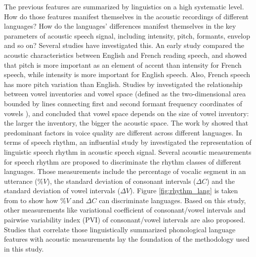 The previous features are summarized by linguistics on a high systematic level. How do those features manifest themselves in the acoustic recordings of different languages? How do the languages' differences manifest themselves in the key parameters of acoustic speech signal, including intensity, pitch, formants, envelop and so on? Several studies have investigated this. An early study \citep{parmenter1933experimental} compared the acoustic characteristics between English and French reading speech, and showed that pitch is more important as an element of accent than intensity for French speech, while intensity is more important for English speech. Also, French speech has more pitch variation than English. Studies by \cite{jongman1989acoustic,bradlow1995comparative,al2005does} investigated the relationship between vowel inventories and vowel space (defined as the two-dimensional area bounded by lines connecting first and second formant frequency coordinates of vowels \citep{fant1973speech}), and concluded that vowel space depends on the size of vowel inventory: the larger the inventory, the bigger the acoustic space. The work by \cite{wagner2003voice} showed that predominant factors in voice quality are different across different languages. In terms of speech rhythm, an influential study by \cite{ramus1999correlates} investigated the representation of linguistic speech rhythm in acoustic speech signal. Several acoustic measurements for speech rhythm are proposed to discriminate the rhythm classes of different languages. Those measurements include the percentage of vocalic segment in an utterance ($\%V$), the standard deviation of consonant intervals ($\Delta C$) and the standard deviation of vowel intervals ($\Delta V$). Figure \ref{fig:rhythm_lang} is taken from \citep{ramus1999correlates} to show how $\%V$ and $\Delta C$ can discriminate languages. Based on this study, other measurements like variational coefficient of consonant/vowel intervals \citep{dellwo2006rhythm} and pairwise variability index (PVI) of consonant/vowel intervals \citep{grabe2002durational} are also proposed. Studies that correlate those linguistically summarized phonological language features with acoustic measurements lay the foundation of the methodology used in this study.

